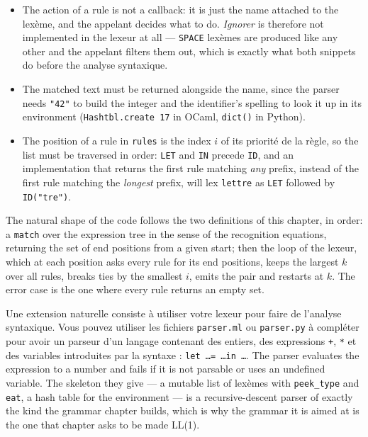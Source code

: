 \begin{itemize}
  \item The action of a rule is not a callback: it is just the name attached to
    the lexème, and the appelant decides what to do. \emph{Ignorer} is therefore
    not implemented in the lexeur at all --- \texttt{SPACE} lexèmes are produced
    like any other and the appelant filters them out, which is exactly what both
    snippets do before the analyse syntaxique.
  \item The matched text must be returned alongside the name, since the parser
    needs \texttt{"42"} to build the integer and the identifier's spelling to
    look it up in its environment (\texttt{Hashtbl.create 17} in OCaml,
    \texttt{dict()} in Python).
  \item The position of a rule in \texttt{rules} is the index $i$ of its
    priorité de la règle, so the list must be traversed in order: \texttt{LET}
    and \texttt{IN} precede \texttt{ID}, and an implementation that returns the
    first rule matching
    \emph{any} prefix, instead of the first rule matching the \emph{longest}
    prefix, will lex \texttt{lettre} as \texttt{LET} followed by
    \texttt{ID("tre")}.
\end{itemize}

\begin{remark}
  The natural shape of the code follows the two definitions of this chapter, in
  order: a \texttt{match} over the expression tree in the sense of the
  recognition equations, returning the set of end positions from a given start;
  then the loop of the lexeur, which at each position asks every rule for its
  end positions, keeps the largest $k$ over all rules, breaks ties by the
  smallest $i$, emits the pair and restarts at $k$. The error case is the one
  where every rule returns an empty set.
\end{remark}

\begin{remark}
  Une extension naturelle consiste à utiliser votre lexeur pour faire de
  l'analyse syntaxique. Vous pouvez utiliser les fichiers \texttt{parser.ml} ou
  \texttt{parser.py} à compléter pour avoir un parseur d'un langage contenant
  des entiers, des expressions \texttt{+}, \texttt{*} et des variables
  introduites par la syntaxe : \texttt{let \ldots = \ldots in \ldots}. The
  parser evaluates the expression to a number and fails if it is not parsable
  or uses an undefined variable. The skeleton they give --- a mutable list of
  lexèmes with \texttt{peek\_type} and \texttt{eat}, a hash table for the
  environment --- is a recursive-descent parser of exactly the kind the grammar
  chapter builds, which is why the grammar it is aimed at is the one that
  chapter asks to be made LL(1).
\end{remark}
